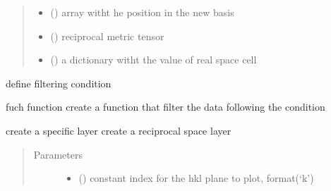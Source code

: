 \documentclass[letterpaper,10pt,english]{sphinxmanual}
\begin{document}
\begin{fulllineitems}
\begin{quote}
\begin{description}
\begin{itemize}
\item {} 
 () \textendash{} array witht he position in the new basis

\item {} 
 () \textendash{} reciprocal metric tensor

\item {} 
 () \textendash{} a dictionary witht the value of
real space cell

\end{itemize}

\end{description}\end{quote}

\begin{fulllineitems}
\label{\detokenize{index:TEMpcPlot.EwaldPeaks.cr_cond}}
define filtering condition

fuch function create a function that filter the data following the condition

\end{fulllineitems}


\begin{fulllineitems}
\label{\detokenize{index:TEMpcPlot.EwaldPeaks.create_layer}}
create a specific layer
create a reciprocal space layer
\begin{quote}\begin{description}
\item[{Parameters}] \leavevmode\begin{itemize}
\item {} 
 () \textendash{} constant index for the hkl plane to plot, format(‘k’)


\end{itemize}
\end{description}
\end{quote}
\end{fulllineitems}
\end{fulllineitems}
\end{document}
